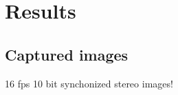 \chapter{Results}
\label{chap:results}



\section{Captured images}
16 fps 10 bit synchonized stereo images!


\pagebreak
